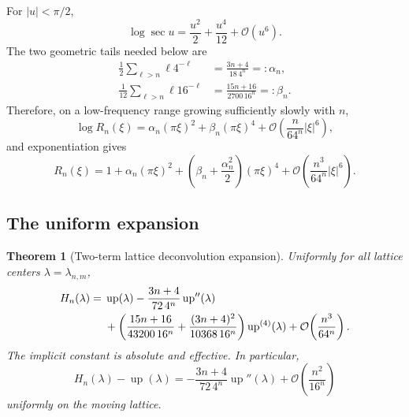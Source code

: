 \documentclass[11pt,oneside]{article}
\newtheorem{theorem}{Theorem}[section]
\theoremstyle{definition}
\theoremstyle{remark}
\newcommand{\Up}{\operatorname{up}}
\newcommand{\bigO}{\mathcal O}
\begin{document}
For $|u|<\pi/2$,
\begin{equation}
 \log\sec u=\frac{u^2}{2}+\frac{u^4}{12}+\bigO(u^6).       \label{tmrates:eq:logsec}
\end{equation}
The two geometric tails needed below are
\begin{align}
 \frac12\sum_{\ell>n}\ell4^{-\ell}
 &=\frac{3n+4}{18\,4^n}=:\alpha_n,                        \label{tmrates:eq:alpha-n}\\
 \frac1{12}\sum_{\ell>n}\ell16^{-\ell}
 &=\frac{15n+16}{2700\,16^n}=: \beta_n.                  \label{tmrates:eq:beta-n}
\end{align}
Therefore, on a low-frequency range growing sufficiently slowly with $n$,
\begin{equation}
 \log R_n(\xi)
 =\alpha_n(\pi\xi)^2+\beta_n(\pi\xi)^4
  +\bigO\!\left(\frac{n}{64^n}|\xi|^6\right),            \label{tmrates:eq:log-Rn}
\end{equation}
and exponentiation gives
\begin{equation}
 R_n(\xi)=1+\alpha_n(\pi\xi)^2
 +\left(\beta_n+\frac{\alpha_n^2}{2}\right)(\pi\xi)^4
 +\bigO\!\left(\frac{n^3}{64^n}|\xi|^6\right).          \label{tmrates:eq:Rn-expansion}
\end{equation}

\subsection{The uniform expansion}

\begin{theorem}[Two-term lattice deconvolution expansion]
\label{tmrates:thm:center-expansion}
Uniformly for all lattice centers $\lambda=\lambda_{n,m}$,
\begin{align}
 H_n(\lambda)
={}&\Up(\lambda)
 -\frac{3n+4}{72\,4^n}\Up''(\lambda) \notag\\
 &+\left(
   \frac{15n+16}{43200\,16^n}
  +\frac{(3n+4)^2}{10368\,16^n}
  \right)\Up^{(4)}(\lambda)
 +\bigO\!\left(\frac{n^3}{64^n}\right).                 \label{tmrates:eq:center-expansion}
\end{align}
The implicit constant is absolute and effective.  In particular,
\begin{equation}
 H_n(\lambda)-\Up(\lambda)
 =-\frac{3n+4}{72\,4^n}\Up''(\lambda)
  +\bigO\!\left(\frac{n^2}{16^n}\right)                 \label{tmrates:eq:center-leading}
\end{equation}
uniformly on the moving lattice.
\end{theorem}
\end{document}
